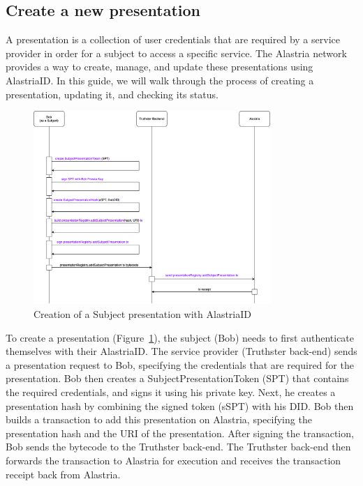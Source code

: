 \documentclass[target=mst,aauheader=]{thud}
\begin{document}
\subsection{Create a new presentation}

A presentation is a collection of user credentials that are required by a service provider in order for a subject to access a specific service. The Alastria network provides a way to create, manage, and update these presentations using AlastriaID. In this guide, we will walk through the process of creating a presentation, updating it, and checking its status.

\begin{figure}
    \centering
    \includegraphics[width=0.8\textwidth]{images/createSubjectPresentation.png}
    \caption{Creation of a Subject presentation with AlastriaID}
    \label{fig:createSubjectPresentation}
\end{figure}

To create a presentation (Figure~\ref{fig:createSubjectPresentation}), the subject (Bob) needs to first authenticate themselves with their AlastriaID. The service provider (Truthster back-end) sends a presentation request to Bob, specifying the credentials that are required for the presentation. Bob then creates a SubjectPresentationToken (SPT) that contains the required credentials, and signs it using his private key. Next, he creates a presentation hash by combining the signed token (sSPT) with his DID. Bob then builds a transaction to add this presentation on Alastria, specifying the presentation hash and the URI of the presentation. After signing the transaction, Bob sends the bytecode to the Truthster back-end. The Truthster back-end then forwards the transaction to Alastria for execution and receives the transaction receipt back from Alastria.
\end{document}
